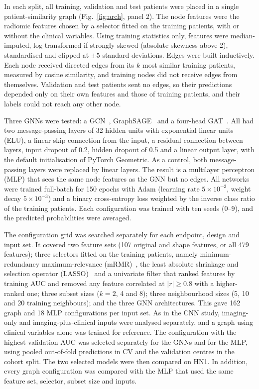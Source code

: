 \documentclass[pdflatex,iicol,sn-nature]{sn-jnl}
\begin{document}
In each split, all training, validation and test patients were placed in a single patient-similarity graph (Fig.~\ref{fig:arch}, panel 2). The node features were the radiomic features chosen by a selector fitted on the training patients, with or without the clinical variables. Using training statistics only, features were median-imputed, log-transformed if strongly skewed (absolute skewness above 2), standardised and clipped at $\pm5$ standard deviations. Edges were built inductively. Each node received directed edges from its $k$ most similar training patients, measured by cosine similarity, and training nodes did not receive edges from themselves. Validation and test patients sent no edges, so their predictions depended only on their own features and those of training patients, and their labels could not reach any other node.

Three GNNs were tested: a GCN~\cite{kipf2017gcn}, GraphSAGE~\cite{hamilton2017graphsage} and a four-head GAT~\cite{velickovic2018gat}. All had two message-passing layers of 32 hidden units with exponential linear units (ELU), a linear skip connection from the input, a residual connection between layers, input dropout of 0.2, hidden dropout of 0.5 and a linear output layer, with the default initialisation of PyTorch Geometric. As a control, both message-passing layers were replaced by linear layers. The result is a multilayer perceptron (MLP) that sees the same node features as the GNN but no edges. All networks were trained full-batch for 150 epochs with Adam (learning rate $5\times10^{-3}$, weight decay $5\times10^{-3}$) and a binary cross-entropy loss weighted by the inverse class ratio of the training patients. Each configuration was trained with ten seeds (0--9), and the predicted probabilities were averaged.

The configuration grid was searched separately for each endpoint, design and input set. It covered two feature sets (107 original and shape features, or all 479 features); three selectors fitted on the training patients, namely minimum-redundancy maximum-relevance (mRMR)~\cite{peng2005mrmr}, the least absolute shrinkage and selection operator (LASSO)~\cite{tibshirani1996lasso} and a univariate filter that ranked features by training AUC and removed any feature correlated at $|r|\geq0.8$ with a higher-ranked one; three subset sizes ($k=2$, 4 and 8); three neighbourhood sizes (5, 10 and 20 training neighbours); and the three GNN architectures. This gave 162 graph and 18 MLP configurations per input set. As in the CNN study, imaging-only and imaging-plus-clinical inputs were analysed separately, and a graph using clinical variables alone was trained for reference. The configuration with the highest validation AUC was selected separately for the GNNs and for the MLP, using pooled out-of-fold predictions in CV and the validation centres in the cohort split. The two selected models were then compared on HN1. In addition, every graph configuration was compared with the MLP that used the same feature set, selector, subset size and inputs.
\end{document}
